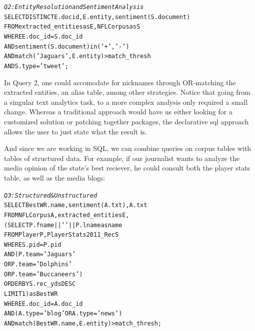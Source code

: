 {%
\begin{small}
\begin{alltt}
\textit{Q2: Entity Resolution and Sentiment Analysis}
SELECT DISTINCT E.docid, E.entity, sentiment(S.document)
FROM extracted_entities as E, NFLCorpus as S
WHERE E.doc_id = S.doc_id
  AND sentiment(S.document) in ('+', '-')
  AND match('Jaguars', E.entity) > match\_thresh
  AND S.type = 'tweet';
\end{alltt}
\end{small}

In Query 2, one could accomodate for nicknames through OR-matching
the extracted entities, an alias table, among other strategies. Notice
that going from a singular text analytics task, to a more 
complex analysis only required a small change. Whereas a traditional
approach would have us either looking for a customized solution or patching
together packages, the declarative sql approach allows the user to just 
state what the result is.

And since we are working in SQL, we can combine queries on corpus 
tables with tables of structured data. For example, if our journalist
wants to analyze the media opinion of the state's best reciever,
he could consult both the player stats table, as well as the media blogs:

\begin{small}
\begin{alltt}
\textit{Q3: Structured & Unstructured}
SELECT BestWR.name, sentiment(A.txt), A.txt
FROM NFLCorpus A, extracted_entities E,
         (SELECT P.fname || ' ' || P.lname as name
          FROM Player P, PlayerStats2011_Rec S
          WHERE S.pid = P.pid
            AND (   P.team = 'Jaguars' 
                 OR P.team = 'Dolphins' 
                 OR P.team = 'Buccaneers')
          ORDER BY S.rec_yds DESC
          LIMIT 1) as BestWR
WHERE E.doc_id = A.doc_id 
  AND (A.type = 'blog' OR A.type = 'news')
  AND match(BestWR.name, E.entity) > match\_thresh;
\end{alltt}
\end{small}

}
